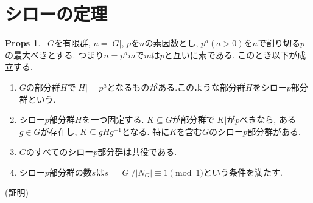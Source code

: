 \documentclass[dvipdfmx]{jsarticle}
\theoremstyle{definition}
\newtheorem{props}{Props}
\numberwithin{equation}{section}
\numberwithin{props}{section}
\numberwithin{definition}{section}
\numberwithin{note}{section}
\begin{document}
\section{シローの定理}
\begin{props}~\label{props::shiro}
     $G$を有限群, $n= \lvert G\rvert$, $p$を$n$の素因数とし, $p^a(a>0)$を$n$で割り切る$p$の最大べきとする. つまり$n=p^a m$で$m$は$p$と互いに素である. このとき以下が成立する. 
     \begin{enumerate}
          \item $G$の部分群$H$で$\lvert H\rvert=p^a$となるものがある.このような部分群$H$をシロー$p$部分群という.
          \item シロー$p$部分群$H$を一つ固定する. $K\subseteq G$が部分群で$\lvert K\rvert$が$p$べきなら, ある$g\in G$が存在し, $K\subseteq gHg^{-1}$となる. 特に$K$を含む$G$のシロー$p$部分群がある.
          \item $G$のすべてのシロー$p$部分群は共役である.
          \item シロー$p$部分群の数$s$は$s=\lvert G\rvert/\lvert N_G\rvert\equiv 1 \pmod 1$という条件を満たす. 
     \end{enumerate}
\end{props}
(証明) 
\end{document}
